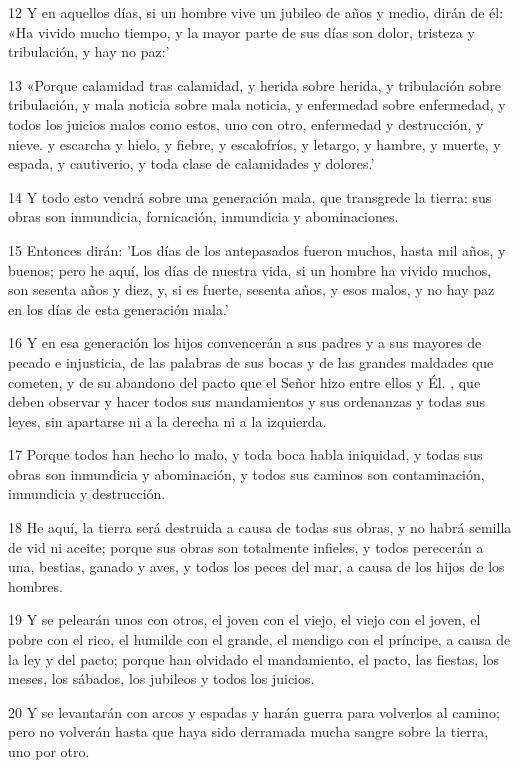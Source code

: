 \par 12 Y en aquellos días, si un hombre vive un jubileo de años y medio, dirán de él: «Ha vivido mucho tiempo, y la mayor parte de sus días son dolor, tristeza y tribulación, y hay no paz:'
\par 13 «Porque calamidad tras calamidad, y herida sobre herida, y tribulación sobre tribulación, y mala noticia sobre mala noticia, y enfermedad sobre enfermedad, y todos los juicios malos como estos, uno con otro, enfermedad y destrucción, y nieve. y escarcha y hielo, y fiebre, y escalofríos, y letargo, y hambre, y muerte, y espada, y cautiverio, y toda clase de calamidades y dolores.'
\par 14 Y todo esto vendrá sobre una generación mala, que transgrede la tierra: sus obras son inmundicia, fornicación, inmundicia y abominaciones.
\par 15 Entonces dirán: 'Los días de los antepasados ​​fueron muchos, hasta mil años, y buenos; pero he aquí, los días de nuestra vida, si un hombre ha vivido muchos, son sesenta años y diez, y, si es fuerte, sesenta años, y esos malos, y no hay paz en los días de esta generación mala.'
\par 16 Y en esa generación los hijos convencerán a sus padres y a sus mayores de pecado e injusticia, de las palabras de sus bocas y de las grandes maldades que cometen, y de su abandono del pacto que el Señor hizo entre ellos y Él. , que deben observar y hacer todos sus mandamientos y sus ordenanzas y todas sus leyes, sin apartarse ni a la derecha ni a la izquierda.
\par 17 Porque todos han hecho lo malo, y toda boca habla iniquidad, y todas sus obras son inmundicia y abominación, y todos sus caminos son contaminación, inmundicia y destrucción.
\par 18 He aquí, la tierra será destruida a causa de todas sus obras, y no habrá semilla de vid ni aceite; porque sus obras son totalmente infieles, y todos perecerán a una, bestias, ganado y aves, y todos los peces del mar, a causa de los hijos de los hombres.
\par 19 Y se pelearán unos con otros, el joven con el viejo, el viejo con el joven, el pobre con el rico, el humilde con el grande, el mendigo con el príncipe, a causa de la ley y del pacto; porque han olvidado el mandamiento, el pacto, las fiestas, los meses, los sábados, los jubileos y todos los juicios.
\par 20 Y se levantarán con arcos y espadas y harán guerra para volverlos al camino; pero no volverán hasta que haya sido derramada mucha sangre sobre la tierra, uno por otro.
